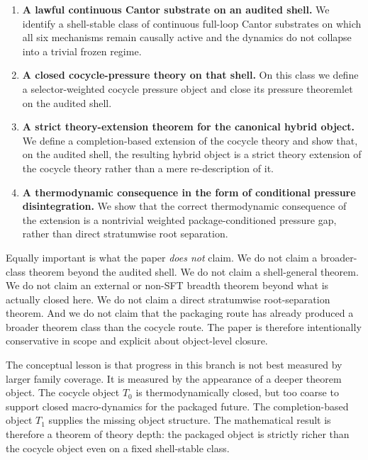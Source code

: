 \documentclass[11pt]{article}
\theoremstyle{definition}
\begin{document}
\begin{enumerate}
    \item \textbf{A lawful continuous Cantor substrate on an audited shell.}
    We identify a shell-stable class of continuous full-loop Cantor substrates on which all six mechanisms remain causally active and the dynamics do not collapse into a trivial frozen regime.

    \item \textbf{A closed cocycle-pressure theory on that shell.}
    On this class we define a selector-weighted cocycle pressure object and close its pressure theoremlet on the audited shell.

    \item \textbf{A strict theory-extension theorem for the canonical hybrid object.}
    We define a completion-based extension of the cocycle theory and show that, on the audited shell, the resulting hybrid object is a strict theory extension of the cocycle theory rather than a mere re-description of it.

    \item \textbf{A thermodynamic consequence in the form of conditional pressure disintegration.}
    We show that the correct thermodynamic consequence of the extension is a nontrivial weighted package-conditioned pressure gap, rather than direct stratumwise root separation.
\end{enumerate}

Equally important is what the paper \emph{does not} claim. We do not claim a broader-class theorem beyond the audited shell. We do not claim a shell-general theorem. We do not claim an external or non-SFT breadth theorem beyond what is actually closed here. We do not claim a direct stratumwise root-separation theorem. And we do not claim that the packaging route has already produced a broader theorem class than the cocycle route. The paper is therefore intentionally conservative in scope and explicit about object-level closure.

The conceptual lesson is that progress in this branch is not best measured by larger family coverage. It is measured by the appearance of a deeper theorem object. The cocycle object \(T_0\) is thermodynamically closed, but too coarse to support closed macro-dynamics for the packaged future. The completion-based object \(T_1\) supplies the missing object structure. The mathematical result is therefore a theorem of theory depth: the packaged object is strictly richer than the cocycle object even on a fixed shell-stable class.
\end{document}
